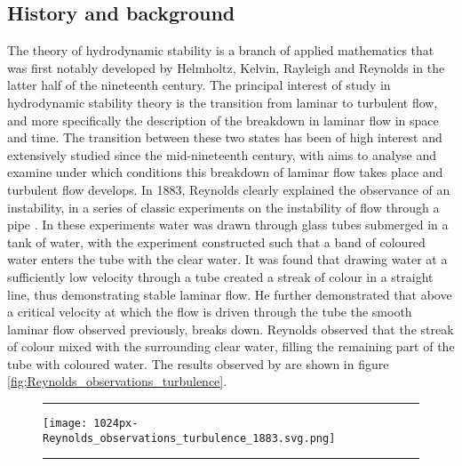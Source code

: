 \documentclass[a4paper, 12pt, twoside, openright]{article}
\numberwithin{equation}{section}
\begin{document}
\subsection{History and background}
The theory of hydrodynamic stability is a branch of applied mathematics that was first notably developed by Helmholtz, Kelvin, Rayleigh and Reynolds in the latter half of the nineteenth century. The principal interest of study in hydrodynamic stability theory is the transition from laminar to turbulent flow, and more specifically the description of the breakdown in laminar flow in space and time. The transition between these two states has been of high interest and extensively studied since the mid-nineteenth century, with aims to analyse and examine under which conditions this breakdown of laminar flow takes place and turbulent flow develops. In 1883, Reynolds clearly explained the observance of an instability, in a series of classic experiments on the instability of flow through a pipe \citep{Reynolds1883}. In these experiments water was drawn through glass tubes submerged in a tank of water, with the experiment constructed such that a band of coloured water enters the tube with the clear water. It was found that drawing water at a sufficiently low velocity through a tube created a streak of colour in a straight line, thus demonstrating stable laminar flow. He further demonstrated that above a critical velocity at which the flow is driven through the tube the smooth laminar flow observed previously, breaks down. Reynolds observed that the streak of colour mixed with the surrounding clear water, filling the remaining part of the tube with coloured water. The results observed by \cite{Reynolds1883} are shown in figure \ref{fig;Reynolds_observations_turbulence}. %

\begin{figure}[ht]
\centering
\rule{\linewidth}{1.5pt}
\texttt{[image: 1024px-Reynolds\_observations\_turbulence\_1883.svg.png]}
\rule{\linewidth}{1.5pt}
\end{figure}
\end{document}
